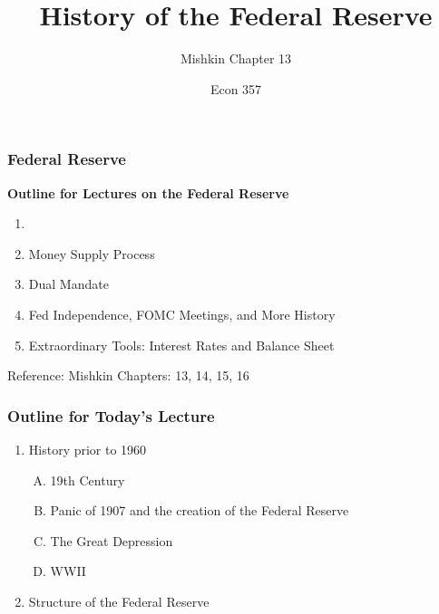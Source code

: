 \documentclass{beamer}
\title{History of the Federal Reserve}
\subtitle{Mishkin Chapter 13}
\author{Econ 357}
\date{\week}
\begin{document}
\frame{\titlepage}

\begin{frame}
    \frametitle{Federal Reserve}

    \textbf{Outline for Lectures on the Federal Reserve}
    \begin{enumerate}
        \item {}
        \item Money Supply Process
        \item Dual Mandate
        \item Fed Independence, FOMC Meetings, and More History
        \item Extraordinary Tools: Interest Rates and Balance Sheet
    \end{enumerate}
    \vspace{1em}
    Reference: Mishkin Chapters: 13, 14, 15, 16

\end{frame}

\begin{frame}
    \frametitle{Outline for Today's Lecture}
    
\begin{enumerate}
    \item History prior to 1960
    \begin{enumerate}[A.]
        \item 19th Century
        \item Panic of 1907 and the creation of the Federal Reserve
        \item The Great Depression
        \item WWII
    \end{enumerate}
    \item Structure of the Federal Reserve
    
\end{enumerate}

\end{frame}
\end{document}
